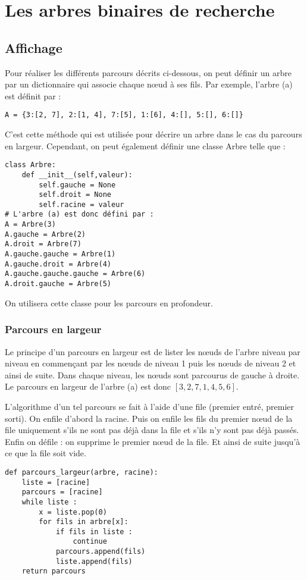 \documentclass{report}
\begin{document}
\section{Les arbres binaires de recherche}
\subsection{Affichage}

Pour réaliser les différents parcours décrits ci-dessous, on peut définir un arbre par un dictionnaire qui associe chaque nœud à ses fils. Par exemple, l'arbre (a) est définit par :
\begin{lstlisting}
A = {3:[2, 7], 2:[1, 4], 7:[5], 1:[6], 4:[], 5:[], 6:[]}
\end{lstlisting}
C'est cette méthode qui est utilisée pour décrire un arbre dans le cas du parcours en largeur. Cependant, on peut également définir une classe Arbre telle que :
\begin{lstlisting}
class Arbre: 
    def __init__(self,valeur): 
        self.gauche = None
        self.droit = None
        self.racine = valeur
# L'arbre (a) est donc défini par :
A = Arbre(3) 
A.gauche = Arbre(2) 
A.droit = Arbre(7) 
A.gauche.gauche = Arbre(1) 
A.gauche.droit = Arbre(4)
A.gauche.gauche.gauche = Arbre(6)
A.droit.gauche = Arbre(5)
\end{lstlisting}
On utilisera cette classe pour les parcours en profondeur.
\subsubsection{Parcours en largeur}
Le principe d'un parcours en largeur est de lister les nœuds de l'arbre niveau par niveau en commençant par les nœuds de niveau 1 puis les nœuds de niveau 2 et ainsi de suite. Dans chaque niveau, les nœuds sont parcourus de gauche à droite.
Le parcours en largeur de l'arbre (a) est donc $[3, 2, 7, 1, 4, 5, 6]$.

L'algorithme d'un tel parcours se fait à l'aide d'une file (premier entré, premier sorti). On enfile d'abord la racine. Puis on enfile les fils du premier nœud de la file uniquement s'ils ne sont pas déjà dans la file et s'ils n'y sont pas déjà passés. Enfin on défile : on supprime le premier nœud de la file. Et ainsi de suite jusqu'à ce que la file soit vide.
\begin{lstlisting}
def parcours_largeur(arbre, racine):
	liste = [racine]
	parcours = [racine]
	while liste :
		x = liste.pop(0)
		for fils in arbre[x]:
			if fils in liste : 
				continue
			parcours.append(fils)
			liste.append(fils)
	return parcours
\end{lstlisting}
\end{document}
